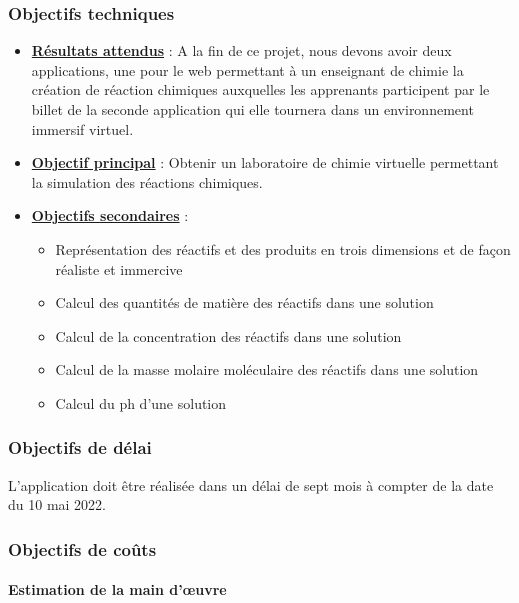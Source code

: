 \subsubsection{Objectifs techniques}
\begin{itemize}
	\item \textbf{\underline{Résultats attendus}} : A la fin de ce projet, nous devons avoir deux applications, une pour le web permettant à un enseignant de chimie la création de réaction chimiques auxquelles les apprenants participent par le billet de la seconde application qui elle tournera dans un environnement immersif virtuel.
	\item \textbf{\underline{Objectif principal}} : Obtenir un laboratoire de chimie virtuelle permettant la simulation des réactions chimiques.
	\item \textbf{\underline{Objectifs secondaires}} :
	      \begin{itemize}
		      \item Représentation des réactifs et des produits en trois dimensions et de façon réaliste et immercive
		      \item Calcul des quantités de matière des réactifs dans une solution
		      \item Calcul de la concentration des réactifs dans une solution
		      \item Calcul de la masse molaire moléculaire des réactifs dans une solution
		      \item Calcul du ph d’une solution
	      \end{itemize}
\end{itemize}

\subsubsection{Objectifs de délai}

L’application doit être réalisée dans un délai de sept mois à compter de la date du 10 mai 2022.

\subsubsection{Objectifs de coûts}

\paragraph{Estimation de la main d’œuvre}


